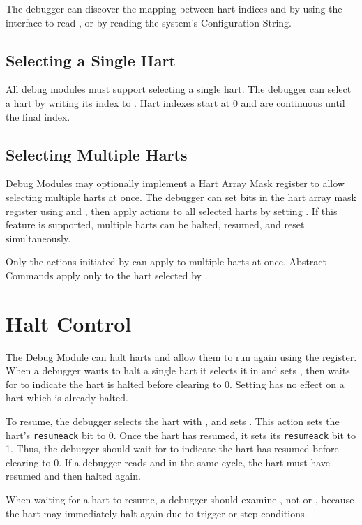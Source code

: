 The debugger can discover the mapping between hart indices and
\Rmhartid by using the interface to read \Rmhartid, or by
reading the system's Configuration String.

\subsection {Selecting a Single Hart}

All debug modules must support selecting a single hart.
The debugger can select a hart by writing its index to \Fhartsel.
Hart indexes start at 0 and are continuous until the final index.

\subsection {Selecting Multiple Harts}

Debug Modules may optionally implement a Hart Array Mask register to allow
selecting multiple harts at once. The debugger can set bits in the hart array mask register
using \Rhawindowsel and \Rhawindow, then apply actions to all selected harts
by setting \Fhasel. If this feature is supported, multiple harts can be
halted, resumed, and reset simultaneously.

Only the actions initiated by \Rdmcontrol can apply to multiple harts
at once, Abstract Commands apply only to the hart selected by
\Fhartsel.

\section{Halt Control} \label{haltcontrol}

The Debug Module can halt harts and allow them to run again using
the \Rdmcontrol register.
When a debugger wants to halt a single hart it selects it in \Fhartsel
and sets \Fhaltreq, then waits
for \Fallhalted to indicate the hart is halted before clearing \Fhaltreq
to 0. Setting \Fhaltreq has no effect on a hart which is already halted.

To resume, the debugger selects the hart with \Fhartsel,
and sets \Fresumereq. This action sets the hart's
{\tt resumeack} bit to 0. Once the hart has resumed, it
sets its {\tt resumeack} bit to 1. Thus, the
debugger should wait for \Fallresumeack to indicate the
hart has resumed before clearing \Fresumereq to 0.
If a debugger reads \Fallresumeack
and \Fallhalted in the same cycle, the hart must have resumed
and then halted again.

\begin{commentary}
  When waiting for a hart to resume, a debugger should
  examine \Fallresumeack, not \Fallrunning
  or \Fallhalted,
  because the hart may immediately halt again due to
  trigger or step conditions.
\end{commentary}

